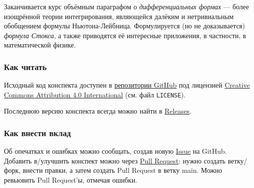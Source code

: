 \documentclass[a4paper,14pt]{extarticle}
\theoremstyle{definition}
\theoremstyle{plain}
\theoremstyle{plain}
\theoremstyle{plain}
\theoremstyle{plain}
\theoremstyle{definition}
\theoremstyle{definition}
\theoremstyle{definition}
\theoremstyle{definition}
\theoremstyle{definition}
\theoremstyle{definition}
\theoremstyle{definition}
\theoremstyle{definition}
\theoremstyle{definition}
\theoremstyle{plain}
\theoremstyle{plain}
\theoremstyle{plain}
\theoremstyle{plain}
\theoremstyle{definition}
\theoremstyle{definition}
\theoremstyle{definition}
\theoremstyle{definition}
\theoremstyle{definition}
\theoremstyle{definition}
\begin{document}
Заканчивается курс объёмным параграфом о \emph{дифференциальных формах} --- более изощрённой теории интегрирования, являющейся далёким и нетривиальным обобщением формулы Ньютона-Лейбница. Формулируется (но не доказывается) \emph{формула Стокса}, а также приводятся её интересные приложения, в частности, в математической физике.

\subsubsection*{Как читать}
Исходный код конспекта доступен в  \href{https://github.com/koreshaSp/matan2/releases}{\color{blue}репозитории GitHub} под лицензией \href{https://creativecommons.org/licenses/by/4.0/}{\color{blue}Creative Commons Attribution 4.0 International} (см. файл \texttt{LICENSE}).

Последнюю версию конспекта всегда можно найти в \href{https://github.com/koreshaSp/matan2/releases}{\color{blue}Releases}.

\subsubsection*{Как внести вклад}
Об опечатках и ошибках можно сообщать, создав новую \href{https://github.com/koreshaSp/matan2/issues}{\color{blue}Issue} на GitHub.
Добавить в/улучшить конспект можно через \href{https://github.com/koreshaSp/matan2/pulls}{\color{blue}Pull Request}: нужно создать ветку/форк, внести правки, а затем создать Pull Request в ветку main.
Можно ревьювить Pull Request'ы, отмечая ошибки.

\newpage
\tableofcontents
\newpage
















\end{document}
